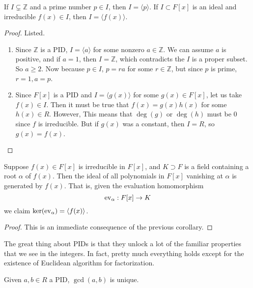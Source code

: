   \begin{corollary}
    If $I \subsetneq \mathbb{Z}$ and a prime number $p \in I$, then $I = \langle p \rangle$. If $I \subset F[x]$ is an ideal and irreducible $f(x) \in I$, then $I = \langle f(x) \rangle$. 
  \end{corollary}
  \begin{proof}
    Listed. 
    \begin{enumerate}
      \item Since $\mathbb{Z}$ is a PID, $I = \langle a \rangle$ for some nonzero $a \in \mathbb{Z}$. We can assume $a$ is positive, and if $a = 1$, then $I = \mathbb{Z}$, which contradicts the $I$ is a proper subset. So $a \geq 2$. Now because $p \in I$, $p = ra$ for some $r \in \mathbb{Z}$, but since $p$ is prime, $r = 1, a = p$. 

      \item Since $F[x]$ is a PID and $I = \langle g(x) \rangle$ for some $g(x) \in F[x]$, let us take $f(x) \in I$. Then it must be true that $f(x) = g(x) h(x)$ for some $h(x) \in R$. However, This means that $\deg(g)$ or $\deg(h)$ must be $0$ since $f$ is irreducible. But if $g(x)$ was a constant, then $I = R$, so $g(x) = f(x)$. 
    \end{enumerate}
  \end{proof}

  \begin{corollary}
    Suppose $f(x) \in F[x]$ is irreducible in $F[x]$, and $K \supset F$ is a field containing a root $\alpha$ of $f(x)$. Then the ideal of all polynomials in $F[x]$ vanishing at $\alpha$ is generated by $f(x)$. That is, given the evaluation homomorphism 
    \begin{equation}
      \operatorname{ev}_\alpha: F[x] \rightarrow K
    \end{equation}
    we claim $\ker(\operatorname{ev}_\alpha) = \langle f(x) \rangle$. 
  \end{corollary}
  \begin{proof}
    This is an immediate consequence of the previous corollary. 
  \end{proof}

  The great thing about PIDs is that they unlock a lot of the familiar properties that we see in the integers. In fact, pretty much everything holds except for the existence of Euclidean algorithm for factorization. 

  \begin{theorem}
    Given $a, b \in R$ a PID, $\gcd(a, b)$ is unique. 
  \end{theorem}

